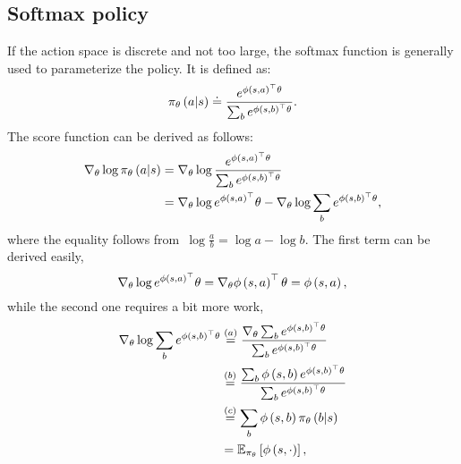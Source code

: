 \subsection{Softmax policy}
If the action space is discrete and not too large, the softmax function is generally used to parameterize the policy. It is defined as:
\begin{equation} \label{eq:softmax_policy}
	\policy_{\policyparameter}\left(\action\middle\vert\state\right)\doteq\frac{e^{\featurevector\left(\state,\action\right)^{\top}\policyparameter}}{\sum_{\varaction}e^{\featurevector\left(\state,\varaction\right)^{\top}\policyparameter}}.
\end{equation}
The score function can be derived as follows:
\begin{align} \textbf{\label{eq:softmax_part1}}
	\nabla_{\policyparameter}\log\policy_{\policyparameter}\left(\action\middle\vert\state\right)
		&=\nabla_{\policyparameter}\log\frac{e^{\featurevector\left(\state,\action\right)^{\top}\policyparameter}}{\sum_{\varaction}e^{\featurevector\left(\state,\varaction\right)^{\top}\policyparameter}} \notag \\
		&=\nabla_{\policyparameter}\log{e^{\featurevector\left(\state,\action\right)^{\top}}\policyparameter}-\nabla_{\policyparameter}\log\sum_{\varaction}e^{\featurevector\left(\state,\varaction\right)^{\top}\policyparameter},
\end{align}
where the equality follows from~${\log\frac{a}{b}=\log{a}-\log{b}}$. The first term can be derived easily,
\begin{equation}
	\nabla_{\policyparameter}\log{e^{\featurevector\left(\state,\action\right)^{\top}}\policyparameter}=\nabla_{\policyparameter}\featurevector\left(\state,\action\right)^{\top}\policyparameter=\featurevector\left(\state,\action\right),
\end{equation}
while the second one requires a bit more work,
\begin{align}
	\nabla_{\policyparameter}\log\sum_{\varaction}e^{\featurevector\left(\state,\varaction\right)^{\top}\policyparameter}
		&\overset{(a)}{=}\frac{\nabla_{\policyparameter}\sum_{\varaction}e^{\featurevector\left(\state,\varaction\right)^{\top}\policyparameter}}{\sum_{\varaction}e^{\featurevector\left(\state,\varaction\right)^{\top}\policyparameter}} \notag \\
		&\overset{(b)}{=}\frac{\sum_{\varaction}\featurevector\left(\state,\varaction\right)e^{\featurevector\left(\state,\varaction\right)^{\top}\policyparameter}}{\sum_{\varaction}e^{\featurevector\left(\state,\varaction\right)^{\top}\policyparameter}} \notag \\
		&\overset{(c)}{=}\sum_{\varaction}\featurevector\left(\state,\varaction\right)\policy_{\policyparameter}\left(\varaction\middle\vert\state\right) \notag \\
		&=\mathbb{E}_{\policy_{\policyparameter}}\left[\featurevector\left(\state,\cdot\right)\right],
\end{align}
